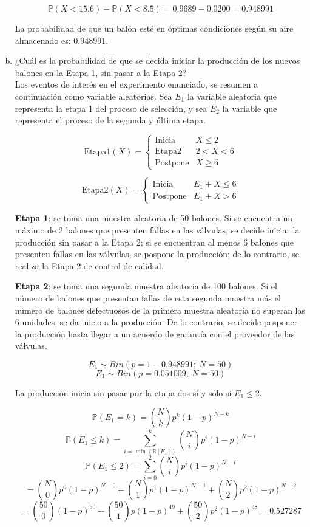 \documentclass[11pt, spanish]{article}
\begin{document}
\begin{enumerate}[(a)]
$$\mathbb{P}(X < 15.6) - \mathbb{P}(X < 8.5) = 0.9689 - 0.0200 = 0.948991$$

La probabilidad de que un balón esté en óptimas condiciones según su aire almacenado es: $0.948991$.

\item ¿Cuál es la probabilidad de que se decida iniciar la producción de los nuevos
balones en la Etapa 1, sin pasar a la Etapa 2?\\

Los eventos de interés en el experimento enunciado, se resumen a continuación como variable aleatorias. Sea $E_{1}$ la variable aleatoria que representa la etapa 1 del proceso de selección, y sea $E_{2}$ la variable que representa el proceso de la segunda y última etapa.

\[ \mbox{Etapa1}(X) = \begin{cases} 
      \mbox{Inicia} & X \leq 2 \\
      \mbox{Etapa2} & 2 < X < 6 \\
      \mbox{Postpone} & X \geq 6
   \end{cases}
\]

\[ \mbox{Etapa2}(X) = \begin{cases} 
      \mbox{Inicia} & E_1 + X \leq 6 \\
      \mbox{Postpone} & E_1 + X > 6
   \end{cases}
\]

\textbf{Etapa 1}: se toma una muestra aleatoria de 50 balones. Si se encuentra un máximo de 2 balones que presenten fallas en las válvulas, se decide iniciar la producción sin pasar a la Etapa 2; si se encuentran al menos 6 balones que presenten fallas en las válvulas, se pospone la producción; de lo contrario, se realiza la Etapa 2 de control de calidad.

\textbf{Etapa 2}: se toma una segunda muestra aleatoria de 100 balones. Si el número de balones que presentan fallas de esta segunda muestra más el número de balones defectuosos de la primera muestra aleatoria no superan las 6 unidades, se da inicio a la producción. De lo contrario, se decide posponer la producción hasta llegar a un acuerdo de garantía con el proveedor de las válvulas.

$$E_1 \sim Bin(p = 1 - 0.948991;\ N = 50)$$
$$E_1 \sim Bin(p = 0.051009;\ N = 50)$$

La producción inicia sin pasar por la etapa dos sí y sólo si $E_1 \leq 2$. 

$$\mathbb{P}(E_1 = k) = \binom{N}{k}p^k(1-p)^{N-k}$$
$$\mathbb{P}(E_1 \leq k) = \sum_{i = \min{\left\{\mathbb{R}[E_1]\right\}}}^{k}  \binom{N}{i}p^i(1-p)^{N-i}$$
$$\mathbb{P}(E_1 \leq 2) = \sum_{i = 0}^{2}  \binom{N}{i}p^i(1-p)^{N-i} $$
$$= \binom{N}{0}p^0(1-p)^{N-0} + \binom{N}{1}p^1(1-p)^{N-1} + \binom{N}{2}p^2(1-p)^{N-2}$$
$$= \binom{50}{0}(1-p)^{50} + \binom{50}{1}p(1-p)^{49} + \binom{50}{2}p^2(1-p)^{48} = 0.527287$$
 

\end{enumerate}
\end{document}
